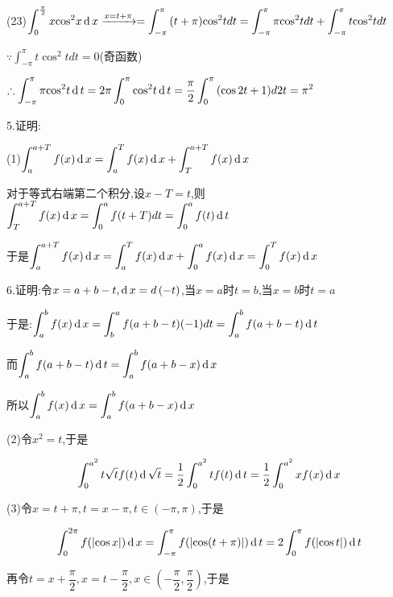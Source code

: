 (23)$\displaystyle\int_0^{\frac{\pi }{2}} {x{{\cos }^2}x} \operatorname{\mathop{}\!\mathrm{d}} x\xrightarrow{{x = t + \pi }} = \displaystyle\int_{ - \pi }^\pi  {(t + \pi ){{\cos }^2}t} dt = \displaystyle\int_{ - \pi }^\pi  {\pi {{\cos }^2}t} dt + \displaystyle\int_{ - \pi }^\pi  {t{{\cos }^2}t} dt$

$\because \displaystyle\int_{ - \pi }^\pi  {t{{\cos }^2}t} dt = 0$(奇函数)

$\therefore \displaystyle\int_{ - \pi }^\pi  {\pi {{\cos }^2}t} \operatorname{\mathop{}\!\mathrm{d}} t = 2\pi \displaystyle\int_0^\pi  {{{\cos }^2}t} \operatorname{\mathop{}\!\mathrm{d}} t = \dfrac{\pi }{2}\displaystyle\int_0^\pi  {(\cos 2t}  + 1)d2t = {\pi ^2}$

5.证明:

(1)$\displaystyle\int_a^{a + T} {f(x)} \operatorname{\mathop{}\!\mathrm{d}} x = \displaystyle\int_a^T {f(x)} \operatorname{\mathop{}\!\mathrm{d}} x + \displaystyle\int_T^{a + T} {f(x)} \operatorname{\mathop{}\!\mathrm{d}} x$

对于等式右端第二个积分,设$x - T = t$,则$\displaystyle\int_T^{a + T} {f(x)} \operatorname{\mathop{}\!\mathrm{d}} x = \displaystyle\int_0^a {f(t + T)} dt = \displaystyle\int_0^a {f(t)} \operatorname{\mathop{}\!\mathrm{d}} t$

于是$\displaystyle\int_a^{a + T} {f(x)} \operatorname{\mathop{}\!\mathrm{d}} x = \displaystyle\int_a^T {f(x)} \operatorname{\mathop{}\!\mathrm{d}} x + \displaystyle\int_0^a {f(x)} \operatorname{\mathop{}\!\mathrm{d}} x = \displaystyle\int_0^T {f(x)} \operatorname{\mathop{}\!\mathrm{d}} x$

6.证明:令$x = a + b - t,\operatorname{\mathop{}\!\mathrm{d}} x = d\left( { - t} \right)$,当$x = a$时$t = b$,当$x = b$时$t = a$

于是:$\displaystyle\int_a^b {f(x)} \operatorname{\mathop{}\!\mathrm{d}} x = \displaystyle\int_b^a {f(a + b - t)( - 1)} dt = \displaystyle\int_a^b {f(a + b - t)} \operatorname{\mathop{}\!\mathrm{d}} t$

而$\displaystyle\int_a^b {f(a + b - t)} \operatorname{\mathop{}\!\mathrm{d}} t = \displaystyle\int_a^b {f(a + b - x)} \operatorname{\mathop{}\!\mathrm{d}} x$

所以$\displaystyle\int_a^b {f(x)} \operatorname{\mathop{}\!\mathrm{d}} x = \displaystyle\int_a^b {f(a + b - x)} \operatorname{\mathop{}\!\mathrm{d}} x$

(2)令${x^2} = t$,于是

\[\displaystyle\int_0^{{a^2}} {t\sqrt t f(t)} \operatorname{\mathop{}\!\mathrm{d}} \sqrt t  = \dfrac{1}{2}\displaystyle\int_0^{{a^2}} {tf(t)} \operatorname{\mathop{}\!\mathrm{d}} t = \dfrac{1}{2}\displaystyle\int_0^{{a^2}} {xf(x)} \operatorname{\mathop{}\!\mathrm{d}} x\]

(3)令$x = t + \pi ,t = x - \pi ,t \in ( - \pi ,\pi )$,于是

\[\displaystyle\int_0^{2\pi } {f(\left| {\cos x} \right|)} \operatorname{\mathop{}\!\mathrm{d}} x = \displaystyle\int_{ - \pi }^\pi  {f(\left| {\cos (t + \pi )} \right|)} \operatorname{\mathop{}\!\mathrm{d}} t = 2\displaystyle\int_0^\pi  {f(\left| {\cos t} \right|)} \operatorname{\mathop{}\!\mathrm{d}} t\]

再令$t = x + \dfrac{\pi }{2},x = t - \dfrac{\pi }{2},x \in ( - \dfrac{\pi }{2},\dfrac{\pi }{2})$,于是

